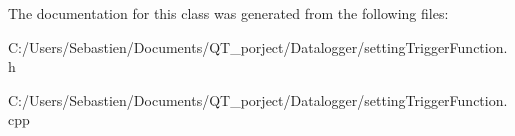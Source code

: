 The documentation for this class was generated from the following files\+:\begin{DoxyCompactItemize}
\item 
C\+:/\+Users/\+Sebastien/\+Documents/\+Q\+T\+\_\+porject/\+Datalogger/setting\+Trigger\+Function.\+h\item 
C\+:/\+Users/\+Sebastien/\+Documents/\+Q\+T\+\_\+porject/\+Datalogger/setting\+Trigger\+Function.\+cpp\end{DoxyCompactItemize}
